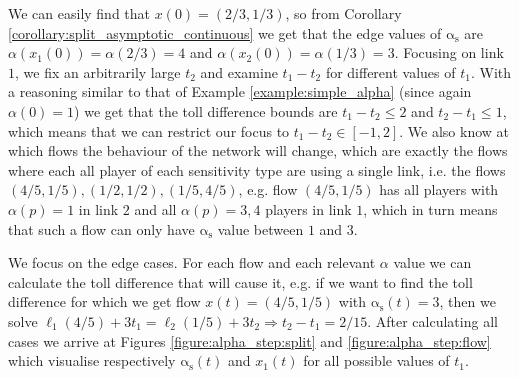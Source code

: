 \documentclass[10pt,a4paper]{book}
\newcommand{\as}{\mathrm{\alpha_s}}
\theoremstyle{definition}
\theoremstyle{comment}
\begin{document}
We can easily find that $x(0) = (2/3, 1/3)$, so from Corollary \ref{corollary:split_asymptotic_continuous} we get that the edge values of $\as$ are $\alpha(x_1(0)) = \alpha(2/3) = 4$ and $\alpha(x_2(0)) = \alpha(1/3) = 3$.
Focusing on link $1$, we fix an arbitrarily large $t_2$ and examine $t_1 - t_2$ for different values of $t_1$.
With a reasoning similar to that of Example \ref{example:simple_alpha} (since again $\alpha(0) = 1$) we get that the toll difference bounds are $t_1 - t_2 \le 2$ and $t_2 - t_1 \le 1$, which means that we can restrict our focus to $t_1 - t_2 \in [-1, 2]$.
We also know at which flows the behaviour of the network will change, which are exactly the flows where each all player of each sensitivity type are using a single link, i.e. the flows $(4/5, 1/5), (1/2, 1/2), (1/5, 4/5)$, e.g. flow $(4/5, 1/5)$ has all players with $\alpha(p) = 1$ in link $2$ and all $\alpha(p) = 3, 4$ players in link $1$, which in turn means that such a flow can only have $\as$ value between $1$ and $3$.

We focus on the edge cases.
For each flow and each relevant $\alpha$ value we can calculate the toll difference that will cause it, e.g. if we want to find the toll difference for which we get flow $x(t) = (4/5, 1/5)$ with $\as(t) = 3$, then we solve $\ell_1(4/5) + 3t_1 = \ell_2(1/5) + 3t_2 \Rightarrow t_2 - t_1 = 2/15$.
After calculating all cases we arrive at Figures \ref{figure:alpha_step:split} and \ref{figure:alpha_step:flow} which visualise respectively $\as(t)$ and $x_1(t)$ for all possible values of $t_1$.
\end{document}
